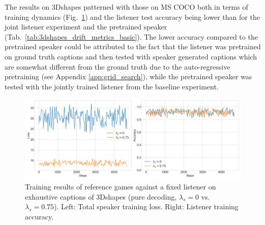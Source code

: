 The results on 3Dshapes patterned with those on MS COCO both in terms of training dynamics (Fig.~\ref{fig:3dshapes_fixed_listener_0_075_speaker_losses_listener_acc}) and the listener test accuracy being lower than for the joint listener experiment and the pretrained speaker (Tab.~\ref{tab:3dshapes_drift_metrics_basic}). The lower accuracy compared to the pretrained speaker could be attributed to the fact that the listener was pretrained on ground truth captions and then tested with speaker generated captions which are somewhat different from the ground truth due to the auto-regressive pretraining (see Appendix \ref{app:grid_search}), while the pretrained speaker was tested with the jointly trained listener from the baseline experiment.
\begin{figure}
	\centering
	\includegraphics[width=\linewidth]{images/3dshapes_fixedListener_baseline_random_0_075_losses.png}
	\caption{Training results of reference games against a fixed listener on exhaustive captions of 3Dshapes (pure decoding, $\lambda_s=0$ vs. $\lambda_s=0.75$). Left: Total speaker training loss. Right: Listener training accuracy.}
	\label{fig:3dshapes_fixed_listener_0_075_speaker_losses_listener_acc}
\end{figure}

